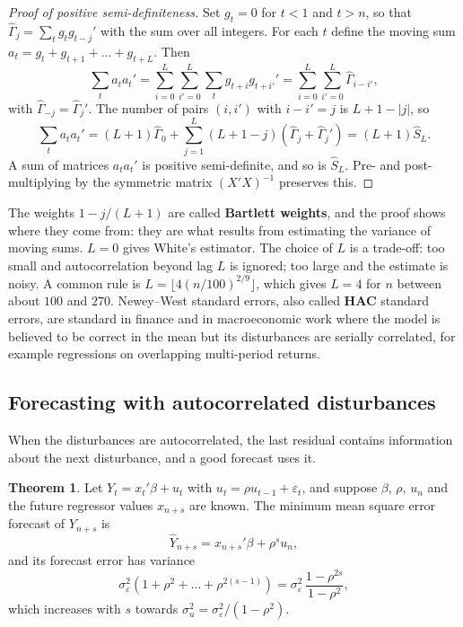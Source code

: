 \documentclass[11pt,a4paper]{article}
\numberwithin{equation}{section}
\theoremstyle{definition}
\newtheorem{thm}{Theorem}[subsection]
\begin{document}
\begin{proof}[Proof of positive semi-definiteness]
Set $g_t = 0$ for $t < 1$ and $t > n$, so that $\hat\Gamma_j = \sum_tg_tg_{t-j}'$ with the sum over all integers. For each $t$ define the moving sum
$a_t = g_t + g_{t+1} + \dots + g_{t+L}$. Then
\[
\sum_ta_ta_t' = \sum_{i=0}^L\sum_{i'=0}^L\sum_tg_{t+i}g_{t+i'}' = \sum_{i=0}^L\sum_{i'=0}^L\hat\Gamma_{i - i'},
\]
with $\hat\Gamma_{-j} = \hat\Gamma_j'$. The number of pairs $(i, i')$ with $i - i' = j$ is $L + 1 - |j|$, so
\[
\sum_ta_ta_t' = (L + 1)\hat\Gamma_0 + \sum_{j=1}^L(L + 1 - j)(\hat\Gamma_j + \hat\Gamma_j') = (L + 1)\hat S_L .
\]
A sum of matrices $a_ta_t'$ is positive semi-definite, and so is $\hat S_L$. Pre- and post-multiplying by the symmetric matrix $(X'X)^{-1}$ preserves this.
\end{proof}

The weights $1 - j/(L + 1)$ are called \textbf{Bartlett weights}, and the proof shows where they come from: they are what results from estimating the
variance of moving sums. $L = 0$ gives White's estimator. The choice of $L$ is a trade-off: too small and autocorrelation beyond lag $L$ is ignored; too
large and the estimate is noisy. A common rule is $L = \lfloor4(n/100)^{2/9}\rfloor$, which gives $L = 4$ for $n$ between about $100$ and $270$. Newey--West
standard errors, also called \textbf{HAC} standard errors, are standard in finance and in macroeconomic work where the model is believed to be correct in
the mean but its disturbances are serially correlated, for example regressions on overlapping multi-period returns.

\subsection{Forecasting with autocorrelated disturbances}
\label{ssec:acforecast}

When the disturbances are autocorrelated, the last residual contains information about the next disturbance, and a good forecast uses it.

\begin{thm}
\label{thm:acforecast}
Let $Y_t = x_t'\beta + u_t$ with $u_t = \rho u_{t-1} + \varepsilon_t$, and suppose $\beta$, $\rho$, $u_n$ and the future regressor values $x_{n+s}$ are known. The minimum
mean square error forecast of $Y_{n+s}$ is
\[
\hat Y_{n+s} = x_{n+s}'\beta + \rho^su_n ,
\]
and its forecast error has variance
\[
\sigma_\varepsilon^2(1 + \rho^2 + \dots + \rho^{2(s-1)}) = \sigma_\varepsilon^2\,\frac{1 - \rho^{2s}}{1 - \rho^2} ,
\]
which increases with $s$ towards $\sigma_u^2 = \sigma_\varepsilon^2/(1 - \rho^2)$.
\end{thm}
\end{document}
